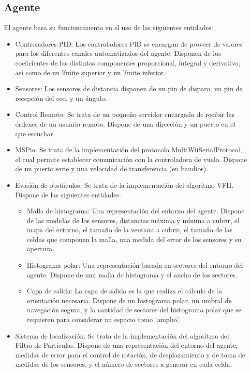 \subsection{Agente}
El agente basa su funcionamiento en el uso de las siguientes entidades: 
\begin{itemize}
\item Controladores PID: Los controladores PID se encargan de proveer de valores para los diferentes canales automatizados del agente. Disponen de los coeficientes de las distintas componentes proporcional, integral y derivativa, así como de un límite superior y un límite inferior.
\item Sensores: Los sensores de distancia disponen de un pin de disparo, un pin de recepción del eco, y un ángulo.
\item Control Remoto: Se trata de un pequeño servidor encargado de recibir las órdenes de un usuario remoto. Dispone de una dirección y un puerto en el que escuchar. 
\item MSPio: Se trata de la implementación del protocolo MultiWiiSerialProtocol, el cual permite establecer comunicación con la controladora de vuelo. Dispone de un puerto serie y una velocidad de transferencia (en baudios).
\item Evasión de obstáculos: Se trata de la implementación del algoritmo VFH. Dispone de las siguientes entidades: 
	\begin{itemize}
	\item Malla de histograma: Una representación del entorno del agente. Dispone de las medidas de los sensores, distancias máxima y mínima a cubrir, el mapa del entorno, el tamaño de la ventana a cubrir, el tamaño de las celdas que componen la malla, una medida del error de los sensores y su apertura.
	\item Histograma polar: Una representación basada en sectores del entorno del agente. Dispone de una malla de histograma y el ancho de los sectores.
	\item Capa de salida: La capa de salida es la que realiza el cálculo de la orientación necesaria. Dispone de un histograma polar, un umbral de navegación segura, y la cantidad de sectores del histograma polar que se requieren para considerar un espacio como `amplio'.
	\end{itemize}
\item Sistema de localización: Se trata de la implementación del algoritmo del Filtro de Partículas. Dispone de una representación del entorno del agente, medidas de error para el control de rotación, de desplazamiento y de toma de medidas de los sensores, y el número de sectores a generar en cada celda. 
\end{itemize}



